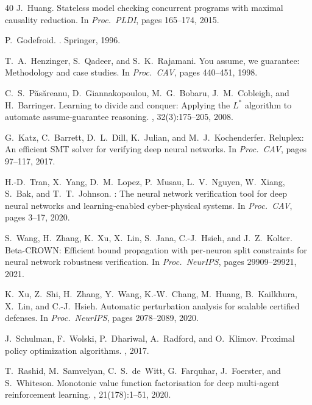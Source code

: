 \documentclass[11pt]{article}
\begin{document}
\begin{thebibliography}{40}
J.~Huang.
\newblock Stateless model checking concurrent programs with maximal causality reduction.
\newblock In {\em Proc.\ PLDI}, pages 165--174, 2015.

P.~Godefroid.
.
\newblock Springer, 1996.

T.~A.~Henzinger, S.~Qadeer, and S.~K.~Rajamani.
\newblock You assume, we guarantee: Methodology and case studies.
\newblock In {\em Proc.\ CAV}, pages 440--451, 1998.

C.~S.~P\u{a}s\u{a}reanu, D.~Giannakopoulou, M.~G.~Bobaru, J.~M.~Cobleigh, and H.~Barringer.
\newblock Learning to divide and conquer: Applying the $L^*$ algorithm to automate assume-guarantee reasoning.
, 32(3):175--205, 2008.

G.~Katz, C.~Barrett, D.~L.~Dill, K.~Julian, and M.~J.~Kochenderfer.
\newblock Reluplex: An efficient {SMT} solver for verifying deep neural networks.
\newblock In {\em Proc.\ CAV}, pages 97--117, 2017.

H.-D.~Tran, X.~Yang, D.~M.~Lopez, P.~Musau, L.~V.~Nguyen, W.~Xiang, S.~Bak, and T.~T.~Johnson.
: The neural network verification tool for deep neural networks and learning-enabled cyber-physical systems.
\newblock In {\em Proc.\ CAV}, pages 3--17, 2020.

S.~Wang, H.~Zhang, K.~Xu, X.~Lin, S.~Jana, C.-J.~Hsieh, and J.~Z.~Kolter.
\newblock Beta-{CROWN}: Efficient bound propagation with per-neuron split constraints for neural network robustness verification.
\newblock In {\em Proc.\ NeurIPS}, pages 29909--29921, 2021.

K.~Xu, Z.~Shi, H.~Zhang, Y.~Wang, K.-W.~Chang, M.~Huang, B.~Kailkhura, X.~Lin, and C.-J.~Hsieh.
\newblock Automatic perturbation analysis for scalable certified defenses.
\newblock In {\em Proc.\ NeurIPS}, pages 2078--2089, 2020.

J.~Schulman, F.~Wolski, P.~Dhariwal, A.~Radford, and O.~Klimov.
\newblock Proximal policy optimization algorithms.
, 2017.

T.~Rashid, M.~Samvelyan, C.~S.~de~Witt, G.~Farquhar, J.~Foerster, and S.~Whiteson.
\newblock Monotonic value function factorisation for deep multi-agent reinforcement learning.
, 21(178):1--51, 2020.


\end{thebibliography}
\end{document}
